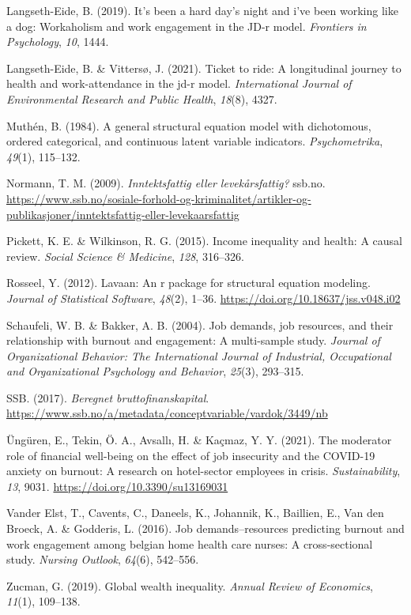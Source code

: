 \documentclass[
  12pt,
  a4paper,
  DIV=11,
  numbers=noendperiod]{scrartcl}
\newlength{\cslhangindent}
\newenvironment{CSLReferences}[2] %
 {\begin{list}{}{%
  \setlength{\itemindent}{0pt}
  \setlength{\leftmargin}{0pt}
  \setlength{\parsep}{0pt}
  \ifodd #1
   \setlength{\leftmargin}{\cslhangindent}
   \setlength{\itemindent}{-1\cslhangindent}
  \fi
  \setlength{\itemsep}{#2\baselineskip}}}
 {\end{list}}
\begin{document}
\begin{CSLReferences}{1}{0}
Langseth-Eide, B. (2019). It's been a hard day's night and i've been
working like a dog: Workaholism and work engagement in the JD-r model.
\emph{Frontiers in Psychology}, \emph{10}, 1444.

Langseth-Eide, B. \& Vittersø, J. (2021). Ticket to ride: A longitudinal
journey to health and work-attendance in the jd-r model.
\emph{International Journal of Environmental Research and Public
Health}, \emph{18}(8), 4327.

Muthén, B. (1984). A general structural equation model with dichotomous,
ordered categorical, and continuous latent variable indicators.
\emph{Psychometrika}, \emph{49}(1), 115--132.

Normann, T. M. (2009). \emph{Inntektsfattig eller levekårsfattig?}
ssb.no.
\url{https://www.ssb.no/sosiale-forhold-og-kriminalitet/artikler-og-publikasjoner/inntektsfattig-eller-levekaarsfattig}

Pickett, K. E. \& Wilkinson, R. G. (2015). Income inequality and health:
A causal review. \emph{Social Science \& Medicine}, \emph{128},
316--326.

Rosseel, Y. (2012). Lavaan: An r package for structural equation
modeling. \emph{Journal of Statistical Software}, \emph{48}(2), 1--36.
\url{https://doi.org/10.18637/jss.v048.i02}

Schaufeli, W. B. \& Bakker, A. B. (2004). Job demands, job resources,
and their relationship with burnout and engagement: A multi-sample
study. \emph{Journal of Organizational Behavior: The International
Journal of Industrial, Occupational and Organizational Psychology and
Behavior}, \emph{25}(3), 293--315.

SSB. (2017). \emph{Beregnet bruttofinanskapital}.
\url{https://www.ssb.no/a/metadata/conceptvariable/vardok/3449/nb}

Üngüren, E., Tekin, Ö. A., Avsallı, H. \& Kaçmaz, Y. Y. (2021). The
moderator role of financial well-being on the effect of job insecurity
and the COVID-19 anxiety on burnout: A research on hotel-sector
employees in crisis. \emph{Sustainability}, \emph{13}, 9031.
\url{https://doi.org/10.3390/su13169031}

Vander Elst, T., Cavents, C., Daneels, K., Johannik, K., Baillien, E.,
Van den Broeck, A. \& Godderis, L. (2016). Job demands--resources
predicting burnout and work engagement among belgian home health care
nurses: A cross-sectional study. \emph{Nursing Outlook}, \emph{64}(6),
542--556.

Zucman, G. (2019). Global wealth inequality. \emph{Annual Review of
Economics}, \emph{11}(1), 109--138.

\end{CSLReferences}
\end{document}
